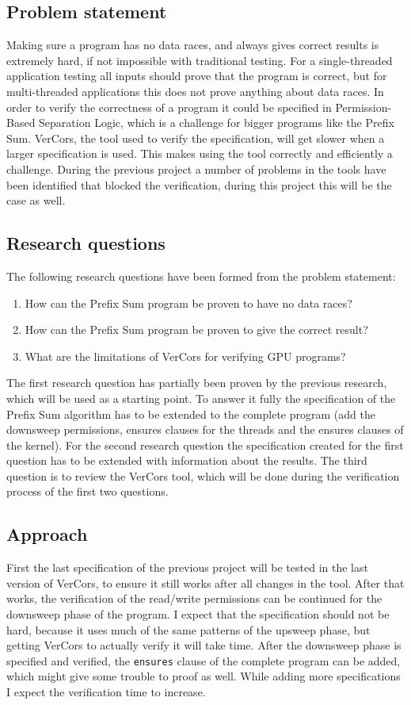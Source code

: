 \documentclass[a4paper]{article}
\newcommand{\code}[1]{\texttt{\small \color{inline}#1}} %
\begin{document}
\subsection{Problem statement}
Making sure a program has no data races, and always gives correct results is extremely hard, if not impossible with traditional testing. For a single-threaded application testing all inputs should prove that the program is correct, but for multi-threaded applications this does not prove anything about data races. In order to verify the correctness of a program it could be specified in Permission-Based Separation Logic, which is a challenge for bigger programs like the Prefix Sum. VerCors, the tool used to verify the specification, will get slower when a larger specification is used. This makes using the tool correctly and efficiently a challenge. During the previous project a number of problems in the tools have been identified that blocked the verification, during this project this will be the case as well.

\subsection{Research questions}
The following research questions have been formed from the problem statement:
\begin{enumerate}
	\item How can the Prefix Sum program be proven to have no data races?
	\item How can the Prefix Sum program be proven to give the correct result?
	\item What are the limitations of VerCors for verifying GPU programs?
\end{enumerate}

The first research question has partially been proven by the previous research, which will be used as a starting point. To answer it fully the specification of the Prefix Sum algorithm has to be extended to the complete program (add the downsweep permissions, ensures clauses for the threads and the ensures clauses of the kernel). For the second research question the specification created for the first question has to be extended with information about the results. The third question is to review the VerCors tool, which will be done during the verification process of the first two questions.

\subsection{Approach}
First the last specification of the previous project will be tested in the last version of VerCors, to ensure it still works after all changes in the tool. After that works, the verification of the read/write permissions can be continued for the downsweep phase of the program. I expect that the specification should not be hard, because it uses much of the same patterns of the upsweep phase, but getting VerCors to actually verify it will take time. After the downsweep phase is specified and verified, the \code{ensures} clause of the complete program can be added, which might give some trouble to proof as well. While adding more specifications I expect the verification time to increase.
\end{document}
